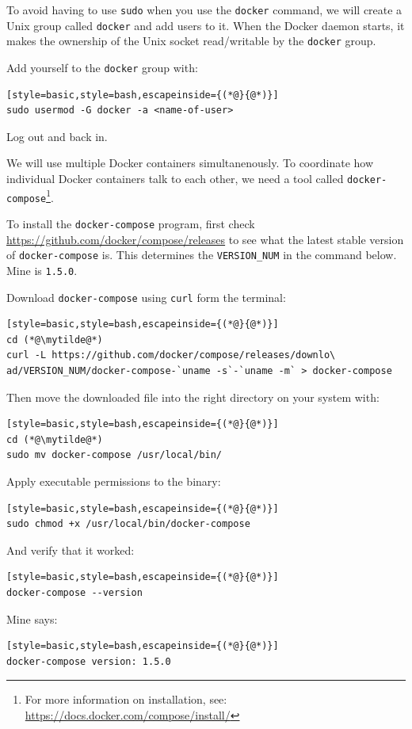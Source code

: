\documentclass[12pt, a4paper, twoside, openany, titlepage]{book}
\begin{document}
To avoid having to use \texttt{sudo} when you use the \texttt{docker} command, we will create a Unix group called \texttt{docker} and add users to it. When the Docker daemon starts, it makes the ownership of the Unix socket read/writable by the \texttt{docker} group.

Add yourself to the \texttt{docker} group with:
\begin{lstlisting}[style=basic,style=bash,escapeinside={(*@}{@*)}]
sudo usermod -G docker -a <name-of-user>
\end{lstlisting}
Log out and back in.

We will use multiple Docker containers simultanenously. To coordinate how individual Docker containers talk to each other, we need a tool called \texttt{docker-compose}\footnote{For more information on installation, see: \url{https://docs.docker.com/compose/install/}}.

To install the \texttt{docker-compose} program, first check \url{https://github.com/docker/compose/releases} to see what the latest stable version of \texttt{docker-compose} is. This determines the \texttt{VERSION\_NUM} in the command below. Mine is \texttt{1.5.0}.

Download \texttt{docker-compose} using \texttt{curl} form the terminal:
\begin{lstlisting}[style=basic,style=bash,escapeinside={(*@}{@*)}]
cd (*@\mytilde@*)
curl -L https://github.com/docker/compose/releases/downlo\
ad/VERSION_NUM/docker-compose-`uname -s`-`uname -m` > docker-compose
\end{lstlisting}

Then move the downloaded file into the right directory on your system with:
\begin{lstlisting}[style=basic,style=bash,escapeinside={(*@}{@*)}]
cd (*@\mytilde@*)
sudo mv docker-compose /usr/local/bin/
\end{lstlisting}

Apply executable permissions to the binary:
\begin{lstlisting}[style=basic,style=bash,escapeinside={(*@}{@*)}]
sudo chmod +x /usr/local/bin/docker-compose
\end{lstlisting}

And verify that it worked:
\begin{lstlisting}[style=basic,style=bash,escapeinside={(*@}{@*)}]
docker-compose --version
\end{lstlisting}
Mine says:
\begin{lstlisting}[style=basic,style=bash,escapeinside={(*@}{@*)}]
docker-compose version: 1.5.0
\end{lstlisting}
\end{document}
